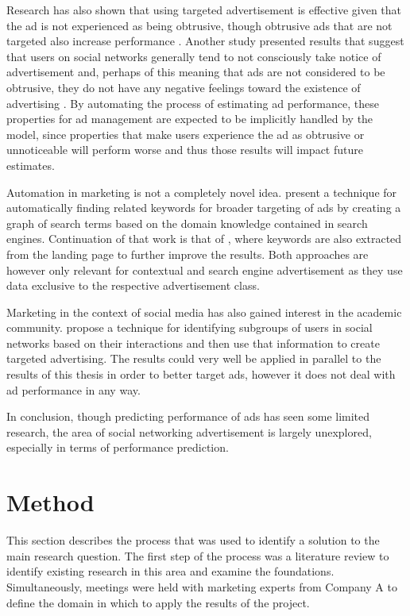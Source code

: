 \documentclass{sig-alternate}
\begin{document}
Research has also shown that using targeted advertisement is effective given that the ad is not experienced as being obtrusive, though obtrusive ads that are not targeted also increase performance \citep{Goldfarb2011}. Another study presented results that suggest that users on social networks generally tend to not consciously take notice of advertisement and, perhaps of this meaning that ads are not considered to be obtrusive, they do not have any negative feelings toward the existence of advertising \citep{Hadija2012}. By automating the process of estimating ad performance, these properties for ad management are expected to be implicitly handled by the model, since properties that make users experience the ad as obtrusive or unnoticeable will perform worse and thus those results will impact future estimates.

Automation in marketing is not a completely novel idea. \cite{Joshi2006} present a technique for automatically finding related keywords for broader targeting of ads by creating a graph of search terms based on the domain knowledge contained in search engines. Continuation of that work is that of \cite{Thomaidou2011}, where keywords are also extracted from the landing page to further improve the results. Both approaches are however only relevant for contextual and search engine advertisement as they use data exclusive to the respective advertisement class.

Marketing in the context of social media has also gained interest in the academic community. \cite{Yang2006} propose a technique for identifying subgroups of users in social networks based on their interactions and then use that information to create targeted advertising. The results could very well be applied in parallel to the results of this thesis in order to better target ads, however it does not deal with ad performance in any way.

In conclusion, though predicting performance of ads has seen some limited research, the area of social networking advertisement is largely unexplored, especially in terms of performance prediction.

\section{Method}
\label{ch:Method}
This section describes the process that was used to identify a solution to the main research question. The first step of the process was a literature review to identify existing research in this area and examine the foundations. Simultaneously, meetings were held with marketing experts from Company A to define the domain in which to apply the results of the project.
\end{document}
